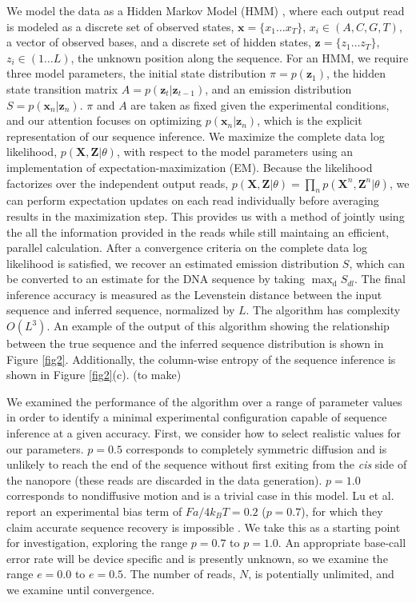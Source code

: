 \documentclass{biophys_letter}
\begin{document}
We model the data as a Hidden Markov Model (HMM) \cite{Rabiner:1989}, where each output read is modeled as a discrete set of observed states, $\mathbf{x}=\{x_{1}\dots x_{T}\}$, $x_i \in (A,C,G,T)$, a vector of observed bases, and a discrete set of hidden states, $\mathbf{z}=\{z_{1} \dots z_{T}\}$, $z_i \in (1 \dots L)$, the unknown position along the sequence.
For an HMM, we require three model parameters, the initial state distribution $\pi=p(\mathbf{z}_{1})$, the hidden state transition matrix $A=p(\mathbf{z}_{t}|\mathbf{z}_{t-1})$, and an emission distribution $S=p(\mathbf{x}_{n}|\mathbf{z}_{n})$. 
$\pi$ and $A$ are taken as fixed given the experimental conditions, and our attention focuses on optimizing $p(\mathbf{x}_{n}|\mathbf{z}_{n})$, which is the explicit representation of our sequence inference.
We maximize the complete data log likelihood, $p(\mathbf{X},\mathbf{Z}|\theta)$, with respect to the model parameters using an implementation of expectation-maximization (EM).
Because the likelihood factorizes over the independent output reads, $p(\mathbf{X},\mathbf{Z}|\theta)=\prod_{n}p(\mathbf{X}^n,\mathbf{Z}^n|\theta)$, we can perform expectation updates on each read individually before averaging results in the maximization step.
This provides us with a method of jointly using the all the information provided in the reads while still maintaing an efficient, parallel calculation.
After a convergence criteria on the complete data log likelihood is satisfied, we recover an estimated emission distribution $S$, which can be converted to an estimate for the DNA sequence by taking $\mathrm{\max_{d}} {S_{dl}}$.
The final inference accuracy is measured as the Levenstein distance between the input sequence and inferred sequence, normalized by $L$.
The algorithm has complexity $O(L^{3})$.
An example of the output of this algorithm showing the relationship between the true sequence and the inferred sequence distribution is shown in Figure \ref{fig2}.
Additionally, the column-wise entropy of the sequence inference is shown in Figure \ref{fig2}(c). (to make)

We examined the performance of the algorithm over a range of parameter values in order to identify a minimal experimental configuration capable of sequence inference at a given accuracy.
First, we consider how to select realistic values for our parameters.
$p=0.5$ corresponds to completely symmetric diffusion and is unlikely to reach the end of the sequence without first exiting from the {\it cis} side of the nanopore (these reads are discarded in the data generation).
$p=1.0$ corresponds to nondiffusive motion and is a trivial case in this model.
Lu et al. report an experimental bias term of $Fa/4k_{B}T=0.2$ ($p=0.7$), for which they claim accurate sequence recovery is impossible \cite{Lu:2011}.
We take this as a starting point for investigation, exploring the range $p=0.7$ to $p=1.0$.
An appropriate base-call error rate will be device specific and is presently unknown, so we examine the range $e=0.0$ to $e=0.5$.
The number of reads, $N$, is potentially unlimited, and we examine until convergence.
\end{document}
